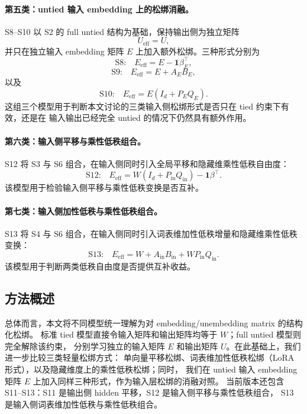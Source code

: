 \paragraph{第五类：untied 输入 embedding 上的松绑消融。}
S8--S10 以 S2 的 full untied 结构为基础，保持输出侧为独立矩阵
\begin{equation}
    U_{\mathrm{eff}} = U,
\end{equation}
并只在独立输入 embedding 矩阵 $E$ 上加入额外松绑。三种形式分别为
\begin{equation}
    \text{S8:}\quad
    E_{\mathrm{eff}} = E-\mathbf{1}\beta_E^\top,
\end{equation}
\begin{equation}
    \text{S9:}\quad
    E_{\mathrm{eff}} = E+A_EB_E,
\end{equation}
以及
\begin{equation}
    \text{S10:}\quad
    E_{\mathrm{eff}} = E(I_d+P_EQ_E).
\end{equation}
这组三个模型用于判断本文讨论的三类输入侧松绑形式是否只在 tied 约束下有效，还是在
输入输出已经完全 untied 的情况下仍然具有额外作用。

\paragraph{第六类：输入侧平移与乘性低秩组合。}
S12 将 S3 与 S6 组合，在输入侧同时引入全局平移和隐藏维乘性低秩自由度：
\begin{equation}
    \text{S12:}\quad
    E_{\mathrm{eff}} =
    W(I_d+P_{\mathrm{in}}Q_{\mathrm{in}})-\mathbf{1}\beta^\top.
\end{equation}
该模型用于检验输入侧平移与乘性低秩变换是否互补。

\paragraph{第七类：输入侧加性低秩与乘性低秩组合。}
S13 将 S4 与 S6 组合，在输入侧同时引入词表维加性低秩增量和隐藏维乘性低秩变换：
\begin{equation}
    \text{S13:}\quad
    E_{\mathrm{eff}} =
    W+A_{\mathrm{in}}B_{\mathrm{in}}+WP_{\mathrm{in}}Q_{\mathrm{in}}.
\end{equation}
该模型用于判断两类低秩自由度是否提供互补收益。

\subsection{方法概述}

总体而言，本文将不同模型统一理解为对 embedding/unembedding matrix 的结构化松绑。
标准 tied 模型直接令输入矩阵和输出矩阵均等于 $W$；full untied 模型则完全解除该约束，
分别学习独立的输入矩阵 $E$ 和输出矩阵 $U$。在此基础上，我们进一步比较三类轻量松绑方式：
单向量平移松绑、词表维加性低秩松绑（LoRA 形式），以及隐藏维度上的乘性低秩松绑；同时，
我们在 untied 输入 embedding 矩阵 $E$ 上加入同样三种形式，作为输入层松绑的消融对照。
当前版本还包含 S11--S13：S11 是输出侧 hidden 平移，S12 是输入侧平移与乘性低秩组合，
S13 是输入侧词表维加性低秩与乘性低秩组合。

